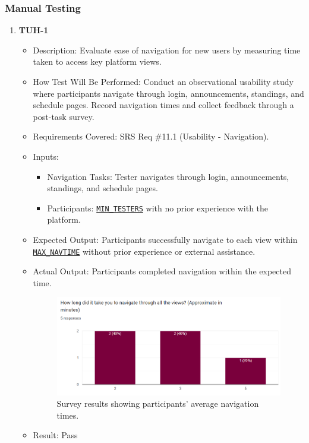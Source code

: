\documentclass[12pt, titlepage]{article}
\begin{document}
\subsubsection{Manual Testing}
\begin{enumerate}
\item \textbf{TUH-1}  
      \begin{itemize}
          \item Description: Evaluate ease of navigation for new users by measuring time taken to access key platform views.
          \item How Test Will Be Performed: Conduct an observational usability study where participants navigate through login, announcements, standings, and schedule pages. Record navigation times and collect feedback through a post-task survey.
          \item Requirements Covered: SRS Req \#11.1 (Usability - Navigation).
          \item Inputs:  
              \begin{itemize}
                  \item Navigation Tasks: Tester navigates through login, announcements, standings, and schedule pages.
                  \item Participants: \hyperref[MIN_TESTERS]{\texttt{MIN\_TESTERS}} with no prior experience with the platform.
              \end{itemize}
          \item Expected Output: Participants successfully navigate to each view within \hyperref[MAX_NAVTIME]{\texttt{MAX\_NAVTIME}} without prior experience or external assistance.
          \item Actual Output: Participants completed navigation within the expected time.
          \begin{figure}[h!]
            \centering
            \includegraphics[width=1\textwidth]{navtime_results.png}
            \caption{Survey results showing participants' average navigation times.}
            \label{fig:navtime}
          \end{figure}
          \item Result: Pass
      \end{itemize}


\end{enumerate}
\end{document}
